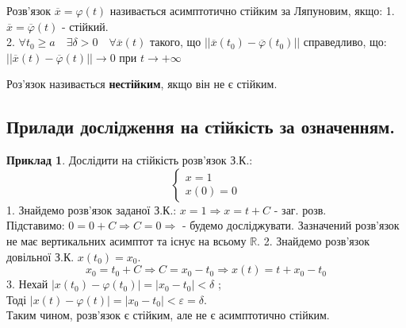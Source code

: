 \documentclass[14pt,a4paper]{scrartcl}
\theoremstyle{definition}
\newtheorem*{example}{Приклад}
\theoremstyle{remark}
\theoremstyle{definition}
\theoremstyle{definition}
\begin{document}
\bd
Розв'язок $ \overline{x} = \varphi(t) $ називається асимптотично стійким за Ляпуновим, якщо:
1. $ \overline{x} = \overline{\varphi} (t)$ - стійкий.\\
2. $\forall t_0 \geq a \quad \exists \delta > 0 \quad \forall \overline{x} (t) $ такого, що $ \left|
\left|  \overline{x} (t_0) - \overline{\varphi} (t_0) \right|
 \right| $ справедливо, що: \\ $  \left|
 \left|  \overline{x} (t) - \overline{\varphi} (t) \right|
  \right| \to 0   $ при $ t \to + \infty$
\ed

\def\vx{\overline{x}}
\def\vphi{\overline{\varphi}}
\def\vf{\overline{f}}

\bd
Роз'язок називається \textbf{нестійким}, якщо він не є стійким.
\ed

\subsection{Прилади дослідження на стійкість за означенням.}

\begin{example}
    Дослідити на стійкість розв'язок З.К.:
$$
\begin{cases}
    x = 1 \\
    x(0) = 0
\end{cases}
$$
1. Знайдемо розв'язок заданої З.К.: $x = 1 \Rightarrow x = t + C$ - заг. розв.\\
Підставимо: $ 0 = 0 + C \Longrightarrow C = 0 \Longrightarrow $  - будемо досліджувати.
Зазначений розв'язок не має вертикальних асимптот та існує на всьому $\mathbb{R}$.
2. Знайдемо розв'язок довільної З.К. $x(t_0) = x_0$.
$$
x_0 = t_0 + C \Rightarrow C = x_0 - t_0 \Rightarrow x(t) = t + x_0 - t_0
$$
3. Нехай $  \left| x(t_0) - \varphi(t_0) \right|  =  \left| x_0 - t_0 \right| < \delta  $ ;\\
Тоді $ \left| x (t) - \varphi (t) \right|  = \left|  x_0 - t_0 \right| < \varepsilon = \delta $.\\
Таким чином, розв'язок є стійким, але не є асимптотично стійким.

\end{example}
\end{document}
